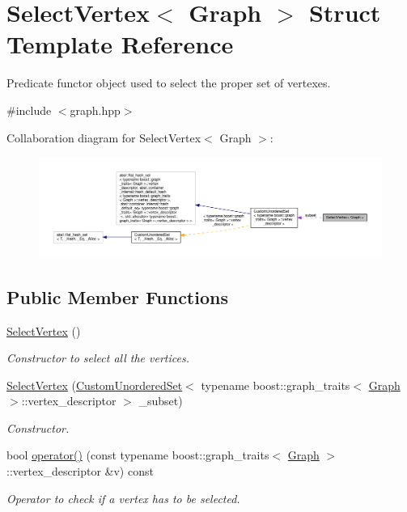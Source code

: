 \hypertarget{structSelectVertex}{}\section{Select\+Vertex$<$ Graph $>$ Struct Template Reference}
\label{structSelectVertex}


Predicate functor object used to select the proper set of vertexes.  




{\ttfamily \#include $<$graph.\+hpp$>$}



Collaboration diagram for Select\+Vertex$<$ Graph $>$\+:
\nopagebreak
\begin{figure}[H]
\begin{center}
\leavevmode
\includegraphics[width=350pt]{d1/d23/structSelectVertex__coll__graph}
\end{center}
\end{figure}
\subsection*{Public Member Functions}
\begin{DoxyCompactItemize}
\item 
\hyperlink{structSelectVertex_aa4047789904bf8a1648df60902c357bd}{Select\+Vertex} ()
\begin{DoxyCompactList}\small\item\em Constructor to select all the vertices. \end{DoxyCompactList}\item 
\hyperlink{structSelectVertex_a6c1518c7187d7d6b42bb362e99bb393b}{Select\+Vertex} (\hyperlink{classCustomUnorderedSet}{Custom\+Unordered\+Set}$<$ typename boost\+::graph\+\_\+traits$<$ \hyperlink{structGraph}{Graph} $>$\+::vertex\+\_\+descriptor $>$ \+\_\+subset)
\begin{DoxyCompactList}\small\item\em Constructor. \end{DoxyCompactList}\item 
bool \hyperlink{structSelectVertex_ae049e8cbeaf936405f8a6148a54f1584}{operator()} (const typename boost\+::graph\+\_\+traits$<$ \hyperlink{structGraph}{Graph} $>$\+::vertex\+\_\+descriptor \&v) const
\begin{DoxyCompactList}\small\item\em Operator to check if a vertex has to be selected. \end{DoxyCompactList}\end{DoxyCompactItemize}
